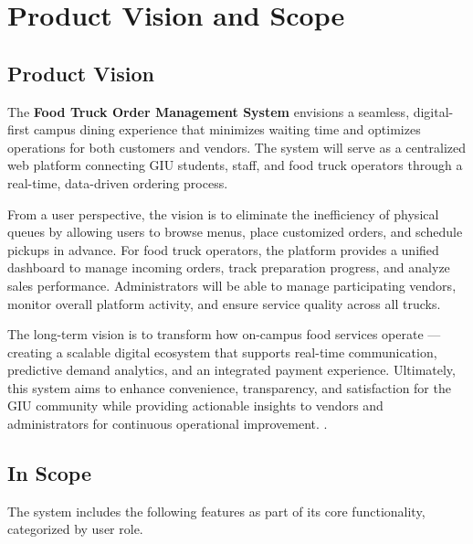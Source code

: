 \documentclass[12pt,a4paper]{article}
\begin{document}
\newpage

\section{Product Vision and Scope}

\subsection{Product Vision}

The \textbf{Food Truck Order Management System} envisions a seamless, digital-first campus dining experience that minimizes waiting time and optimizes operations for both customers and vendors. The system will serve as a centralized web platform connecting GIU students, staff, and food truck operators through a real-time, data-driven ordering process.

From a user perspective, the vision is to eliminate the inefficiency of physical queues by allowing users to browse menus, place customized orders, and schedule pickups in advance. For food truck operators, the platform provides a unified dashboard to manage incoming orders, track preparation progress, and analyze sales performance. Administrators will be able to manage participating vendors, monitor overall platform activity, and ensure service quality across all trucks.

The long-term vision is to transform how on-campus food services operate — creating a scalable digital ecosystem that supports real-time communication, predictive demand analytics, and an integrated payment experience. Ultimately, this system aims to enhance convenience, transparency, and satisfaction for the GIU community while providing actionable insights to vendors and administrators for continuous operational improvement.
.

\subsection{In Scope}
The system includes the following features as part of its core functionality, categorized by user role.
\end{document}
